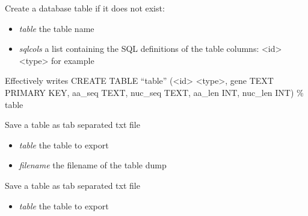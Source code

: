\documentclass[a4paper,11pt,english]{sphinxmanual}
\begin{document}
\begin{fulllineitems}

\begin{fulllineitems}
\label{modules_doc:cbmpy.CBNetDB.DBTools.createDBTable}
Create a database table if it does not exist:
\begin{itemize}
\item {} 
\emph{table} the table name

\item {} 
\emph{sqlcols} a list containing the SQL definitions of the table columns: \textless{}id\textgreater{} \textless{}type\textgreater{} for example 

\end{itemize}

Effectively writes CREATE TABLE ``table'' (\textless{}id\textgreater{} \textless{}type\textgreater{}, gene TEXT PRIMARY KEY, aa\_seq TEXT, nuc\_seq TEXT, aa\_len INT, nuc\_len INT) \% table

\end{fulllineitems}


\begin{fulllineitems}
\label{modules_doc:cbmpy.CBNetDB.DBTools.dumpTableToCSV}
Save a table as tab separated txt file
\begin{itemize}
\item {} 
\emph{table} the table to export

\item {} 
\emph{filename} the filename of the table dump

\end{itemize}

\end{fulllineitems}


\begin{fulllineitems}
\label{modules_doc:cbmpy.CBNetDB.DBTools.dumpTableToTxt}
Save a table as tab separated txt file
\begin{itemize}
\item {} 
\emph{table} the table to export


\end{itemize}
\end{fulllineitems}
\end{fulllineitems}
\end{document}
